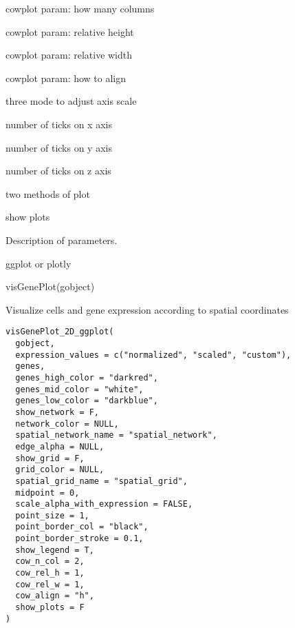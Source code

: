 \documentclass[a4paper]{book}
\begin{document}
\begin{Arguments}
\begin{ldescription}
\item[\code{cow\_n\_col}] cowplot param: how many columns

\item[\code{cow\_rel\_h}] cowplot param: relative height

\item[\code{cow\_rel\_w}] cowplot param: relative width

\item[\code{cow\_align}] cowplot param: how to align

\item[\code{axis\_scale}] three mode to adjust axis scale

\item[\code{x\_ticks}] number of ticks on x axis

\item[\code{y\_ticks}] number of ticks on y axis

\item[\code{z\_ticks}] number of ticks on z axis

\item[\code{plot\_method}] two methods of plot

\item[\code{show\_plots}] show plots
\end{ldescription}
\end{Arguments}
%
\begin{Details}\relax
Description of parameters.
\end{Details}
%
\begin{Value}
ggplot or plotly
\end{Value}
%
\begin{Examples}
\begin{ExampleCode}
    visGenePlot(gobject)
\end{ExampleCode}
\end{Examples}
%
\begin{Description}\relax
Visualize cells and gene expression according to spatial coordinates
\end{Description}
%
\begin{Usage}
\begin{verbatim}
visGenePlot_2D_ggplot(
  gobject,
  expression_values = c("normalized", "scaled", "custom"),
  genes,
  genes_high_color = "darkred",
  genes_mid_color = "white",
  genes_low_color = "darkblue",
  show_network = F,
  network_color = NULL,
  spatial_network_name = "spatial_network",
  edge_alpha = NULL,
  show_grid = F,
  grid_color = NULL,
  spatial_grid_name = "spatial_grid",
  midpoint = 0,
  scale_alpha_with_expression = FALSE,
  point_size = 1,
  point_border_col = "black",
  point_border_stroke = 0.1,
  show_legend = T,
  cow_n_col = 2,
  cow_rel_h = 1,
  cow_rel_w = 1,
  cow_align = "h",
  show_plots = F
)
\end{verbatim}
\end{Usage}
\end{document}
